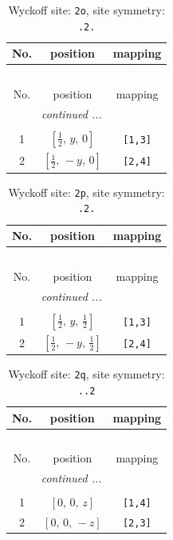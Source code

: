 \documentclass[fleqn,8pt]{jsarticle}
\begin{document}
\renewcommand{\arraystretch}{1.2}
\begin{longtable}{ccc}
\caption{Wyckoff site: {\tt 2o}, site symmetry: {\tt .2.}}
 \\
 \hline \hline
No. & position & mapping \\ \hline \endfirsthead

\multicolumn{2}{l}{\tablename\ \thetable{}} \\
 \hline \hline
No. & position & mapping \\ \hline \endhead

 \hline \hline
\multicolumn{2}{r}{\footnotesize\it continued ...} \\ \endfoot

 \hline \hline
\multicolumn{2}{r}{} \\ \endlastfoot

1 & $\left[ \frac{1}{2},\, y,\, 0 \right]$ & {\tt [1,3]} \\ \hline
2 & $\left[ \frac{1}{2},\, - y,\, 0 \right]$ & {\tt [2,4]} \\
\end{longtable}
\renewcommand{\arraystretch}{1.2}
\begin{longtable}{ccc}
\caption{Wyckoff site: {\tt 2p}, site symmetry: {\tt .2.}}
 \\
 \hline \hline
No. & position & mapping \\ \hline \endfirsthead

\multicolumn{2}{l}{\tablename\ \thetable{}} \\
 \hline \hline
No. & position & mapping \\ \hline \endhead

 \hline \hline
\multicolumn{2}{r}{\footnotesize\it continued ...} \\ \endfoot

 \hline \hline
\multicolumn{2}{r}{} \\ \endlastfoot

1 & $\left[ \frac{1}{2},\, y,\, \frac{1}{2} \right]$ & {\tt [1,3]} \\ \hline
2 & $\left[ \frac{1}{2},\, - y,\, \frac{1}{2} \right]$ & {\tt [2,4]} \\
\end{longtable}
\renewcommand{\arraystretch}{1.2}
\begin{longtable}{ccc}
\caption{Wyckoff site: {\tt 2q}, site symmetry: {\tt ..2}}
 \\
 \hline \hline
No. & position & mapping \\ \hline \endfirsthead

\multicolumn{2}{l}{\tablename\ \thetable{}} \\
 \hline \hline
No. & position & mapping \\ \hline \endhead

 \hline \hline
\multicolumn{2}{r}{\footnotesize\it continued ...} \\ \endfoot

 \hline \hline
\multicolumn{2}{r}{} \\ \endlastfoot

1 & $\left[ 0,\, 0,\, z \right]$ & {\tt [1,4]} \\ \hline
2 & $\left[ 0,\, 0,\, - z \right]$ & {\tt [2,3]} \\
\end{longtable}
\end{document}
